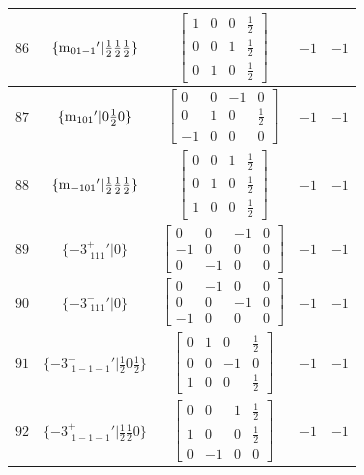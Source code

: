 \documentclass[fleqn,8pt]{jsarticle}
\begin{document}
\begin{longtable}{ccccc}
$ 86 $ & $ \{{\rm m}_{01-1}{}'|\frac{1}{2} \frac{1}{2} \frac{1}{2}\} $ & $ \begin{bmatrix} 1 & 0 & 0 & \frac{1}{2} \\ 0 & 0 & 1 & \frac{1}{2} \\ 0 & 1 & 0 & \frac{1}{2} \end{bmatrix} $ & $ -1 $ & $ -1 $ \\ \hline
$ 87 $ & $ \{{\rm m}_{101}{}'|0 \frac{1}{2} 0\} $ & $ \begin{bmatrix} 0 & 0 & -1 & 0 \\ 0 & 1 & 0 & \frac{1}{2} \\ -1 & 0 & 0 & 0 \end{bmatrix} $ & $ -1 $ & $ -1 $ \\ \hline
$ 88 $ & $ \{{\rm m}_{-101}{}'|\frac{1}{2} \frac{1}{2} \frac{1}{2}\} $ & $ \begin{bmatrix} 0 & 0 & 1 & \frac{1}{2} \\ 0 & 1 & 0 & \frac{1}{2} \\ 1 & 0 & 0 & \frac{1}{2} \end{bmatrix} $ & $ -1 $ & $ -1 $ \\ \hline
$ 89 $ & $ \{-3^{+}_{\,\,111}{}'|0\} $ & $ \begin{bmatrix} 0 & 0 & -1 & 0 \\ -1 & 0 & 0 & 0 \\ 0 & -1 & 0 & 0 \end{bmatrix} $ & $ -1 $ & $ -1 $ \\ \hline
$ 90 $ & $ \{-3^{-}_{\,\,111}{}'|0\} $ & $ \begin{bmatrix} 0 & -1 & 0 & 0 \\ 0 & 0 & -1 & 0 \\ -1 & 0 & 0 & 0 \end{bmatrix} $ & $ -1 $ & $ -1 $ \\ \hline
$ 91 $ & $ \{-3^{-}_{\,\,1-1-1}{}'|\frac{1}{2} 0 \frac{1}{2}\} $ & $ \begin{bmatrix} 0 & 1 & 0 & \frac{1}{2} \\ 0 & 0 & -1 & 0 \\ 1 & 0 & 0 & \frac{1}{2} \end{bmatrix} $ & $ -1 $ & $ -1 $ \\ \hline
$ 92 $ & $ \{-3^{+}_{\,\,1-1-1}{}'|\frac{1}{2} \frac{1}{2} 0\} $ & $ \begin{bmatrix} 0 & 0 & 1 & \frac{1}{2} \\ 1 & 0 & 0 & \frac{1}{2} \\ 0 & -1 & 0 & 0 \end{bmatrix} $ & $ -1 $ & $ -1 $ \\ \hline

\end{longtable}
\end{document}
